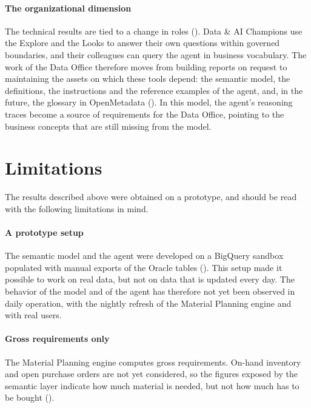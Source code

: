 \paragraph{The organizational dimension}
The technical results are tied to a change in roles (). Data \& AI Champions use the Explore and the Looks to answer their own questions within governed boundaries, and their colleagues can query the agent in business vocabulary. The work of the Data Office therefore moves from building reports on request to maintaining the assets on which these tools depend: the semantic model, the definitions, the instructions and the reference examples of the agent, and, in the future, the glossary in OpenMetadata (). In this model, the agent's reasoning traces become a source of requirements for the Data Office, pointing to the business concepts that are still missing from the model.

\section{Limitations}
\label{sec:conclusions_limitations}

The results described above were obtained on a prototype, and should be read with the following limitations in mind.

\paragraph{A prototype setup}
The semantic model and the agent were developed on a BigQuery sandbox populated with manual exports of the Oracle tables (). This setup made it possible to work on real data, but not on data that is updated every day. The behavior of the model and of the agent has therefore not yet been observed in daily operation, with the nightly refresh of the Material Planning engine and with real users.

\paragraph{Gross requirements only}
The Material Planning engine computes gross requirements. On-hand inventory and open purchase orders are not yet considered, so the figures exposed by the semantic layer indicate how much material is needed, but not how much has to be bought ().

